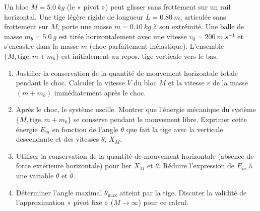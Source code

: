 \documentclass[11pt]{article}
\begin{document}
\begin{exercice}
Un bloc $M = \SI{5,0}{kg}$ (le « pivot ») peut glisser sans frottement sur un rail horizontal. Une tige légère rigide de longueur $L = \SI{0,80}{m}$, articulée sans frottement sur $M$, porte une masse $m = \SI{0,10}{kg}$ à son extrémité. Une balle de masse $m_b = \SI{5,0}{g}$ est tirée horizontalement avec une vitesse $v_0 = \SI{200}{m.s^{-1}}$ et s'encastre dans la masse $m$ (choc parfaitement inélastique). L'ensemble $\{M, \text{tige}, m+m_b\}$ est initialement au repos, tige verticale vers le bas.
\begin{enumerate}
    \item Justifier la conservation de la quantité de mouvement horizontale totale pendant le choc. Calculer la vitesse $V$ du bloc $M$ et la vitesse $v$ de la masse $(m+m_b)$ immédiatement après le choc.
    \item Après le choc, le système oscille. Montrer que l'énergie mécanique du système $\{M, \text{tige}, m+m_b\}$ se conserve pendant le mouvement libre. Exprimer cette énergie $E_m$ en fonction de l'angle $\theta$ que fait la tige avec la verticale descendante et des vitesses $\dot{\theta}$, $\dot{X}_M$.
    \item Utiliser la conservation de la quantité de mouvement horizontale (absence de force extérieure horizontale) pour lier $\dot{X}_M$ et $\dot{\theta}$. Réduire l'expression de $E_m$ à une variable $\theta$ et $\dot{\theta}$.
    \item Déterminer l'angle maximal $\theta_{\max}$ atteint par la tige. Discuter la validité de l'approximation « pivot fixe » ($M \to \infty$) pour ce calcul.
\end{enumerate}
\end{exercice}
\end{document}
